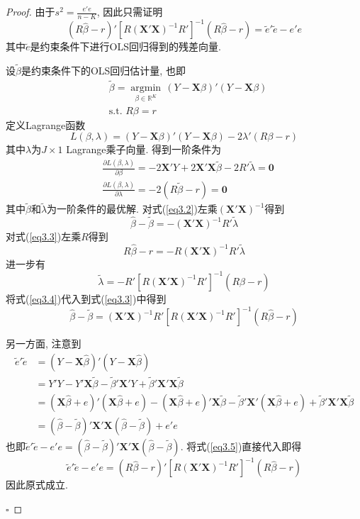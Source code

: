 \documentclass[cn,12pt,math=mtpro2,citestyle=gb7714-2015,bibstyle=gb7714-2015,twocol,mode=simple]{elegantbook}
\newcommand{\hbeta}{\hat{\beta}}
\newcommand{\tbeta}{\tilde{\beta}}
\begin{document}
\begin{proof}
  由于$\displaystyle s^2=\frac{e'e}{n-K}$, 因此只需证明
  $$(R\hbeta-r)'[R(\mathbf{X}'\mathbf{X})^{-1}R']^{-1}(R\hbeta-r)=\tilde{e}'\tilde{e}-e'e$$
  其中$\tilde{e}$是约束条件下进行OLS回归得到的残差向量.

  设$\tbeta$是约束条件下的OLS回归估计量, 也即
  \begin{align*}
  &\tbeta=\underset{\beta \in \mathbb{R}^{K}}{\operatorname{\arg\min}}\,(Y-\mathbf{X}\beta)'(Y-\mathbf{X}\beta) \\
  &\text{s.t. }R\beta=r
  \end{align*}
  定义Lagrange函数
  $$L(\beta,\lambda)=(Y-\mathbf{X}\beta)'(Y-\mathbf{X}\beta)-2\lambda'(R\beta-r)$$
  其中$\lambda$为$J \times 1$ Lagrange乘子向量. 得到一阶条件为
  \begin{align}
  &\frac{\partial L(\beta,\lambda)}{\partial \beta}=-2\mathbf{X}'Y+2\mathbf{X}'\mathbf{X}\tbeta-2R'\tilde{\lambda}=\mathbf{0} \label{eq3.2} \tag{3.2} \\
  &\frac{\partial L(\beta,\lambda)}{\partial \lambda}=-2(R\tbeta-r)=\mathbf{0} \nonumber
  \end{align}
  其中$\tbeta$和$\tilde{\lambda}$为一阶条件的最优解. 对式(\ref{eq3.2})左乘$(\mathbf{X}'\mathbf{X})^{-1}$得到
  \begin{equation}\label{eq3.3}
  \hbeta-\tbeta=-(\mathbf{X}'\mathbf{X})^{-1}R'\tilde{\lambda} \tag{3.3}
  \end{equation}
  对式(\ref{eq3.3})左乘$R$得到
  $$R\hbeta-r=-R(\mathbf{X}'\mathbf{X})^{-1}R'\tilde{\lambda}$$
  进一步有
  \begin{equation}\label{eq3.4}
  \tilde{\lambda}=-R'[R(\mathbf{X}'\mathbf{X})^{-1}R']^{-1}(R\hbeta-r) \tag{3.4}
  \end{equation}
  将式(\ref{eq3.4})代入到式(\ref{eq3.3})中得到
  \begin{equation}\label{eq3.5}
  \hbeta-\tbeta=(\mathbf{X}'\mathbf{X})^{-1}R'[R(\mathbf{X}'\mathbf{X})^{-1}R']^{-1}(R\hbeta-r) \tag{3.5}
  \end{equation}

  另一方面, 注意到
  \begin{align*}
  \tilde{e}'\tilde{e}&=(Y-\mathbf{X}\hbeta)'(Y-\mathbf{X}\hbeta) \\
  &=Y'Y-Y'\mathbf{X}\tbeta-\tbeta'\mathbf{X}'Y+\tbeta'\mathbf{X}'\mathbf{X}\tbeta \\
  &=(\mathbf{X}\hbeta+e)'(\mathbf{X}\hbeta+e)-(\mathbf{X}\hbeta+e)'\mathbf{X}\tbeta-\tbeta'\mathbf{X}'(\mathbf{X}\hbeta+e)+\tbeta'\mathbf{X}'\mathbf{X}\tbeta \\
  &=(\hbeta-\tbeta)'\mathbf{X}'\mathbf{X}(\hbeta-\tbeta)+e'e
  \end{align*}
  也即$\tilde{e}'\tilde{e}-e'e=(\hbeta-\tbeta)'\mathbf{X}'\mathbf{X}(\hbeta-\tbeta)$. 将式(\ref{eq3.5})直接代入即得
  $$\tilde{e}'\tilde{e}-e'e=(R\hbeta-r)'[R(\mathbf{X}'\mathbf{X})^{-1}R']^{-1}(R\hbeta-r)$$
  因此原式成立.

  $\square$
\end{proof}
\end{document}
